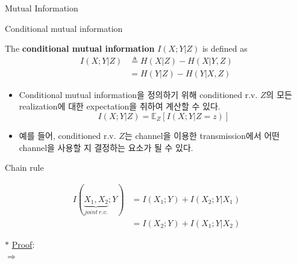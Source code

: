 \documentclass[9pt]{beamer}
\begin{document}
\begin{section}{Mutual Information}
        \begin{frame}{Conditional mutual information}
            \begin{definition}
                The \textbf{conditional mutual information} $I(X;Y|Z)$ is defined as
                \begin{align*}
                    I(X;Y|Z) &\triangleq H(X|Z) - H(X|Y, Z)\\ &= H(Y|Z) - H(Y|X, Z )
                \end{align*}
            \end{definition}
            \begin{itemize}
                \item Conditional mutual information을 정의하기 위해 conditioned r.v. $Z$의 모든 realization에 대한 expectation을 취하여 계산할 수 있다.
                $$I(X;Y|Z) = \mathbb E_{Z}[I(X;Y|Z=z)] $$
                \item 예를 들어, conditioned r.v. $Z$는 channel을 이용한 transmission에서 어떤 channel을 사용할 지 결정하는 요소가 될 수 있다.
            \end{itemize}
        \end{frame}
        
        \begin{frame}{Chain rule}
            \begin{theorem}
                \vspace{-0.4cm}
                \begin{align*} I(\underbrace{X_1, X_2}_{joint\  r.v.} ; Y)&=I\left(X_1 ; Y\right)+I\left(X_2 ; Y | X_1\right)\\ &=I(X_2 ; Y) + I(X_1;Y|X_2) \end{align*}
            \end{theorem}
            \vspace{0.3cm}
            $\ast$ \underline{Proof}: 
            \\ $\Rightarrow$
            \vspace{3cm}
        \end{frame}
    \end{section}
\end{document}
